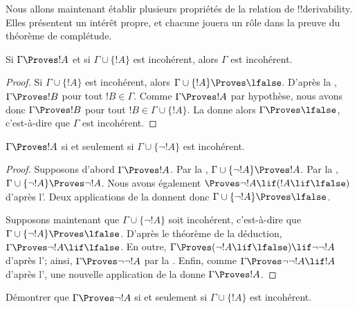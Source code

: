 \documentclass[11pt,a4paper,openany]{memoir}
\begin{document}

Nous allons maintenant établir plusieurs propriétés de la relation de
!!{derivability}. Elles présentent un intérêt propre, et chacune
jouera un rôle dans la preuve du théorème de complétude.

\begin{prop}
Si $\Gamma \Proves !A$ et si $\Gamma \cup \{!A\}$ est incohérent,
alors $\Gamma$ est incohérent.
\end{prop}

\begin{proof}
Si $\Gamma \cup \{!A\}$ est incohérent, alors
$\Gamma \cup \{!A\} \Proves \lfalse$. D'après la
, $\Gamma \Proves !B$ pour tout
$!B \in \Gamma$. Comme $\Gamma \Proves !A$ par hypothèse, nous avons
donc $\Gamma \Proves !B$ pour tout
$!B \in \Gamma \cup \{!A\}$. La  donne
alors $\Gamma \Proves \lfalse$, c'est-à-dire que $\Gamma$ est
incohérent.
\end{proof}

\begin{prop}
$\Gamma \Proves !A$ si et seulement si
$\Gamma \cup \{\lnot !A\}$ est incohérent.
\end{prop}

\begin{proof}
Supposons d'abord $\Gamma \Proves !A$. Par la
,
$\Gamma \cup \{\lnot !A\} \Proves !A$. Par la
,
$\Gamma \cup \{\lnot !A\} \Proves \lnot !A$. Nous avons également
$\Proves \lnot !A \lif (!A \lif \lfalse)$ d'après
l'. Deux applications de la
 donnent donc
$\Gamma \cup \{\lnot !A\} \Proves \lfalse$.

Supposons maintenant que $\Gamma \cup \{\lnot !A\}$ soit incohérent,
c'est-à-dire que
$\Gamma \cup \{\lnot !A\} \Proves \lfalse$. D'après le théorème de
la déduction, $\Gamma \Proves \lnot !A \lif \lfalse$. En outre,
$\Gamma \Proves (\lnot !A \lif \lfalse) \lif \lnot\lnot !A$ d'après
l'; ainsi,
$\Gamma \Proves \lnot\lnot !A$ par la . Enfin,
comme $\Gamma \Proves \lnot\lnot !A \lif !A$ d'après
l', une nouvelle application de la
 donne $\Gamma \Proves !A$.
\end{proof}

\begin{prob}
Démontrer que $\Gamma \Proves \lnot !A$ si et seulement si
$\Gamma \cup \{!A\}$ est incohérent.
\end{prob}
\end{document}
